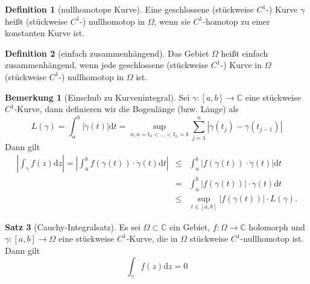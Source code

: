 \documentclass[11pt,titlepage]{article}
\theoremstyle{definition}
\newtheorem{theorem}{Satz}[section]
\newtheorem{definition}[theorem]{Definition}
\newtheorem{remark}{Bemerkung}
\theoremstyle{remark}
\begin{document}
	\begin{definition}[nullhomotope Kurve]
		Eine geschlossene (stückweise $C^1$-) Kurve $\gamma$ heißt (stückweise $C^1$-) nullhomotop 
		in $\Omega$, wenn sie $C^1$-homotop zu einer konstanten Kurve ist.
	\end{definition}
	
	\begin{definition}[einfach zusammenhängend]
		Das Gebiet $\Omega$ heißt einfach zusammenhängend, wenn jede geschlossene (stückweise 
		$C^1$-) Kurve in $\Omega$ (stückweise $C^1$-) nullhomotop in $\Omega$ ist.
	\end{definition}
	
	\begin{remark}[Einschub zu Kurvenintegral]
		Sei $\gamma:[a,b]\to\mathbb{C}$ eine stückweise $C^1$-Kurve, dann definieren wir die 
		Bogenlänge (bzw. Länge) als
		\[ L(\gamma)=\int_a^b |\dot{\gamma}(t)|\mathrm{d}t =\sup_{n,a=t_0 <\ldots <t_n =b} 
		\sum_{j=1}^n |\gamma(t_j)-\gamma(t_{j-1})| \]
		Dann gilt
		\begin{eqnarray*}
			\left|\int_{\gamma} f(z)\mathrm{d}z \right| = \left|\int_a^b f(\gamma(t))\cdot 
			\dot{\gamma}(t)\mathrm{d}t \right| 
			&\leq& \int_a^b |f(\gamma(t))\cdot \dot{\gamma}(t) |\mathrm{d}t \\
			&=& \int_a^b |f(\gamma(t))|\cdot \dot{\gamma}(t)\mathrm{d}t \\
			&\leq& \sup_{t\in [a,b]} |f(\gamma(t))| \cdot L(\gamma).
		\end{eqnarray*}
	\end{remark}
	
	\begin{theorem}[Cauchy-Integralsatz] \label{thm:CI}
		Es sei $\Omega\subset\mathbb{C}$ ein Gebiet, $f:\Omega\to\mathbb{C}$ holomorph und 
		$\gamma:[a,b]\to\Omega$ eine stückweise $C^1$-Kurve, die in $\Omega$ stückweise 
		$C^1$-nullhomotop ist. Dann gilt 
		\[ \int_{\gamma} f(z) \mathrm{d}z =0 \]
	\end{theorem}
	
\end{document}
